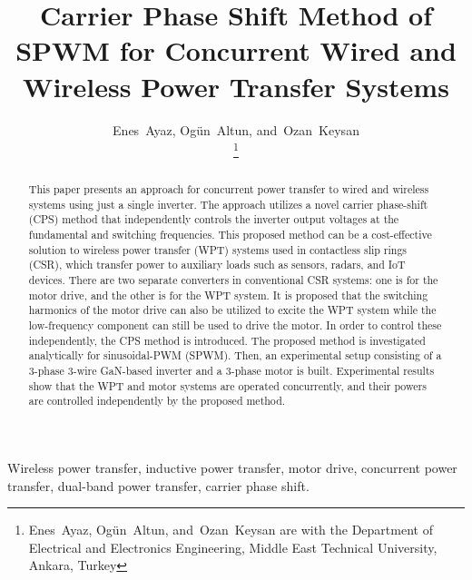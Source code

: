 \documentclass[journal]{IEEEtran}
\begin{document}
\title{Carrier Phase Shift Method of SPWM for Concurrent Wired and Wireless Power Transfer Systems}

\author{Enes~Ayaz,
        Ogün~Altun,
        and~Ozan~Keysan %

\thanks{Enes~Ayaz,
        Ogün~Altun,
        and~Ozan~Keysan are with the Department
of Electrical and Electronics Engineering, Middle East Technical University, Ankara, Turkey}

}

\maketitle
\begin{abstract}
This paper presents an approach for concurrent power transfer to wired and wireless systems using just a single inverter. 
The approach utilizes a novel carrier phase-shift (CPS) method that independently controls the inverter output voltages at the fundamental and switching frequencies. 
This proposed method can be a cost-effective solution to wireless power transfer (WPT) systems used in contactless slip rings (CSR), which transfer power to auxiliary loads such as sensors, radars, and IoT devices.
There are two separate converters in conventional CSR systems: one is for the motor drive, and the other is for the WPT system. 
It is proposed that the switching harmonics of the motor drive can also be utilized to excite the WPT system while the low-frequency component can still be used to drive the motor.  
In order to control these independently, the CPS method is introduced.
The proposed method is investigated analytically for sinusoidal-PWM (SPWM). Then, an experimental setup consisting of a 3-phase 3-wire  GaN-based inverter and a 3-phase motor is built. 
Experimental results show that the WPT and motor systems are operated concurrently, and their powers are controlled independently by the proposed method.
\end{abstract}

\begin{IEEEkeywords}
Wireless power transfer, inductive power transfer, motor drive, concurrent power transfer, dual-band power transfer, carrier phase shift.
\end{IEEEkeywords}

\IEEEpeerreviewmaketitle
\end{document}
